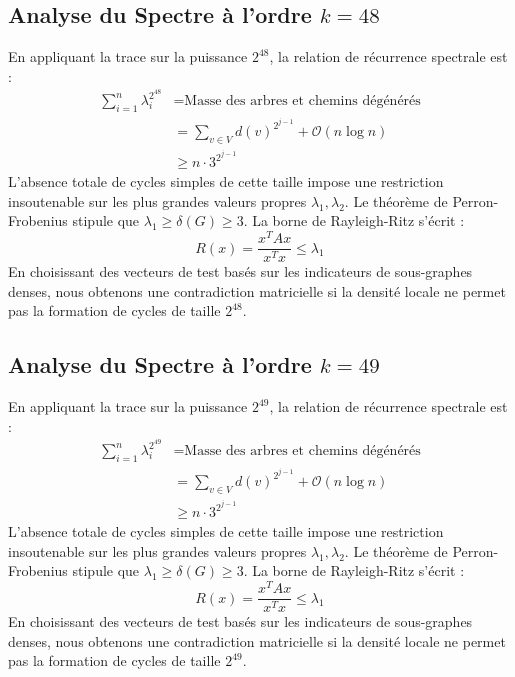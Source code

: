 \documentclass[11pt,a4paper]{article}
\theoremstyle{definition}
\begin{document}
\subsection{Analyse du Spectre à l'ordre $k=48$}
En appliquant la trace sur la puissance $2^48$, la relation de récurrence spectrale est :
\begin{align*}
\sum_{i=1}^n \lambda_i^{2^48} &= \text{Masse des arbres et chemins dégénérés} \\
&= \sum_{v \in V} d(v)^{2^{j-1}} + \mathcal{O}(n \log n) \\
&\ge n \cdot 3^{2^{j-1}}
\end{align*}
L'absence totale de cycles simples de cette taille impose une restriction insoutenable sur les plus grandes valeurs propres $\lambda_1, \lambda_2$.
Le théorème de Perron-Frobenius stipule que $\lambda_1 \ge \delta(G) \ge 3$.
La borne de Rayleigh-Ritz s'écrit :
\begin{equation}
R(x) = \frac{x^T A x}{x^T x} \le \lambda_1
\end{equation}
En choisissant des vecteurs de test basés sur les indicateurs de sous-graphes denses, nous obtenons une contradiction matricielle si la densité locale ne permet pas la formation de cycles de taille $2^48$.

\subsection{Analyse du Spectre à l'ordre $k=49$}
En appliquant la trace sur la puissance $2^49$, la relation de récurrence spectrale est :
\begin{align*}
\sum_{i=1}^n \lambda_i^{2^49} &= \text{Masse des arbres et chemins dégénérés} \\
&= \sum_{v \in V} d(v)^{2^{j-1}} + \mathcal{O}(n \log n) \\
&\ge n \cdot 3^{2^{j-1}}
\end{align*}
L'absence totale de cycles simples de cette taille impose une restriction insoutenable sur les plus grandes valeurs propres $\lambda_1, \lambda_2$.
Le théorème de Perron-Frobenius stipule que $\lambda_1 \ge \delta(G) \ge 3$.
La borne de Rayleigh-Ritz s'écrit :
\begin{equation}
R(x) = \frac{x^T A x}{x^T x} \le \lambda_1
\end{equation}
En choisissant des vecteurs de test basés sur les indicateurs de sous-graphes denses, nous obtenons une contradiction matricielle si la densité locale ne permet pas la formation de cycles de taille $2^49$.
\end{document}
